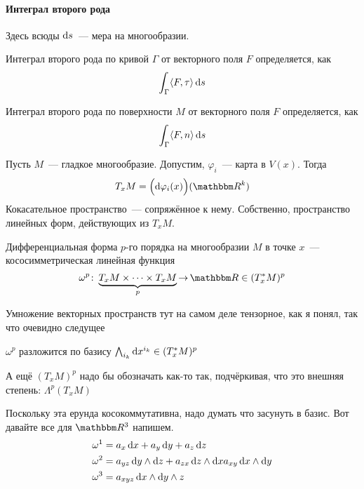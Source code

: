 \documentclass[12pt,draft,timbord]{longnotes}
\begin{document}
\paragraph{Интеграл второго рода}
\label{par:dg::secint}

Здесь всюды $\mathrm{d} s$~--- мера на многообразии.
\begin{defn}\label{defn:dg::secint::curv}
  Интеграл второго рода по кривой $\Gamma$  от векторного поля $F$ определяется, как 
  \[
  \int_\Gamma  \langle F ,\tau \rangle \, \mathrm{d} s
  \]
\end{defn}

\begin{defn}\label{defn:dg::secint::curv}
  Интеграл второго рода по поверхности $M$  от векторного поля $F$ определяется, как 
  \[
  \int_\Gamma  \langle F ,n \rangle \, \mathrm{d} s
  \]
\end{defn}

\begin{defn}\label{defn:dg::AAAA::tangentbndl}
  Пусть $M$~--- гладкое многообразие. Допустим, $\varphi_i$~--- карта в $V(x)$.
  Тогда
  \[
    T_x M = \Bigl(\del \varphi_i (x)\Bigr)(\R^k)
  \]
  Кокасательное пространство~--- сопряжённое к нему. Собственно, пространство линейных форм,
  действующих из $T_xM$.
\end{defn}

\begin{defn}\label{defn:dg::secint::difform}
  Дифференциальная форма $p$-го порядка на многообразии $M$ в точке $x$~--- 
  кососимметрическая линейная функция 
  \[
    \omega^p \colon \underbrace{T_x M \times \dotsm \times T_x M}_p  \to \R \in (T^*_x M)^p
  \]
\end{defn}
Умножение векторных пространств тут на самом деле тензорное, как я понял, так что
очевидно следущее
\begin{stat}\label{stat:dg::secint::difformbasis}
  $\omega^p$ разложится по базису $\bigwedge_{i_k} \mathrm{d} x^{i_k} \in (T^*_x M)^p$
\end{stat}
А ещё $(T_xM)^p$ надо бы обозначать как-то так, подчёркивая, что это внешняя степень: 
$\Lambda^p (T_xM)$

\begin{exmp}\label{exmp:dg::secint::difformbasis}
  Поскольку эта ерунда косокоммутативна, надо думать что засунуть в базис.
  Вот давайте все для $\R^3$ напишем.
  \begin{align*}
    \omega^1 &= a_x\,\mathrm{d} x + a_y\,\mathrm{d} y + a_z\,\mathrm{d} z \\
    \omega^2 &= a_{yz}\,\mathrm{d} y\wedge\mathrm{d} z+a_{zx}\,\mathrm{d} z \wedge\mathrm{d} xa_{xy}\,\mathrm{d} x\wedge\mathrm{d} y\\
    \omega^3 &= a_{xyz}\,\mathrm{d} x \wedge\mathrm{d} y\wedge z
  \end{align*}
\end{exmp}
\end{document}
